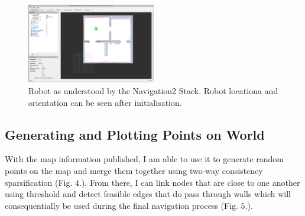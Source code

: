 \documentclass[conference]{IEEEtran}
\begin{document}
\begin{figure}[h]
  \centering
  \includegraphics[width=0.5\textwidth]{../assets/map_nav_1.png}
  \caption{Robot as understood by the Navigation2 Stack. Robot locationa and orientation can be seen after initialisation.}
  \label{fig:example}
\end{figure}

\subsection{Generating and Plotting Points on World}
With the map information published, I am able to use it to generate random points on the map and merge them together using two-way consistency sparsification (Fig. 4.). From there, I can link nodes that are close to one another using threshold and detect feasible edges that do pass through walls which will consequentially be used during the final navigation process (Fig. 5.).
\end{document}
